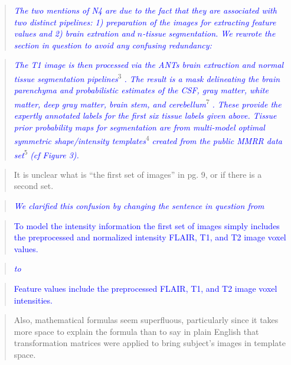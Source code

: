 \documentclass[12pt,]{article}
\begin{document}
\begin{quote}
\emph{\textcolor{blue}{The two mentions of N4 are due to the fact that they are associated
with two distinct pipelines:  1) preparation of the images for extracting feature values
and 2) brain extration and $n$-tissue segmentation.  We rewrote the section in question
to avoid any confusing redundancy:}}
\end{quote}

\begin{quote}
\emph{\textcolor{blue}{The T1 image is then processed via the ANTs brain
extraction and normal tissue segmentation pipelines}}\textsuperscript{3}
\emph{\textcolor{blue}{.  The result is a mask delineating the brain
parenchyma and probabilistic estimates of the CSF, gray matter, white matter,
deep gray matter, brain stem, and cerebellum}}\textsuperscript{7}
\emph{\textcolor{blue}{.  These provide the expertly annotated labels for the
first six tissue labels given above.  Tissue prior probability maps for segmentation
are from multi-model optimal symmetric shape/intensity templates}}\textsuperscript{4}
\emph{\textcolor{blue}{created from the public MMRR data set}}\textsuperscript{5}
\emph{\textcolor{blue}{(cf Figure 3).}}
\end{quote}

\begin{quote}
It is unclear what is ``the first set of images'' in pg. 9, or if there
is a second set.
\end{quote}

\begin{quote}
\emph{\textcolor{blue}{We clarified this confusion by changing the sentence in question from}}
\end{quote}

\begin{quote}
\textcolor{blue}{To model the intensity information the first set of images simply includes the
preprocessed and normalized intensity FLAIR, T1, and T2 image voxel values.}
\end{quote}

\begin{quote}
\emph{\textcolor{blue}{to}}
\end{quote}

\begin{quote}
\textcolor{blue}{Feature values include the preprocessed FLAIR, T1, and T2 image voxel intensities.}
\end{quote}

\begin{quote}
Also, mathematical formulas seem superfluous, particularly since it
takes more space to explain the formula than to say in plain English
that transformation matrices were applied to bring subject's images in
template space.
\end{quote}
\end{document}

